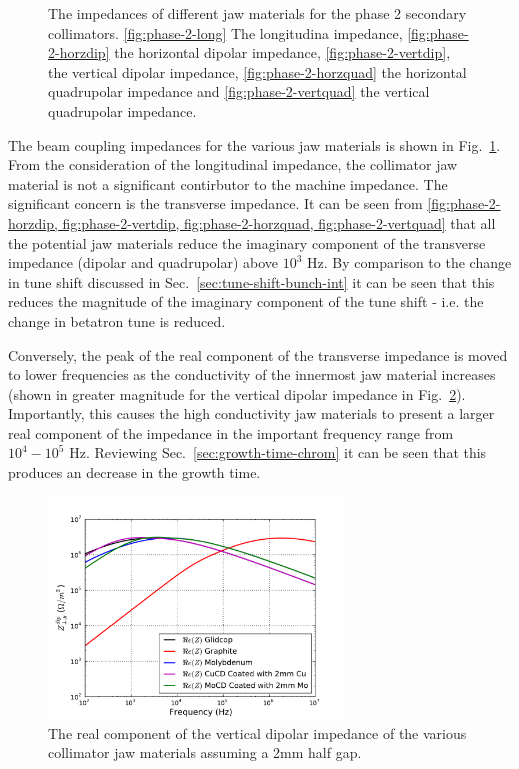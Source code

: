 \begin{figure}
{\label{fig:phase-2-vertquad}
}
\label{fig:phase-2-jaw-impedances}
\caption{The impedances of different jaw materials for the phase 2 secondary collimators. \ref{fig:phase-2-long} The longitudina impedance, \ref{fig:phase-2-horzdip} the horizontal dipolar impedance, \ref{fig:phase-2-vertdip}, the vertical dipolar impedance, \ref{fig:phase-2-horzquad} the horizontal quadrupolar impedance and \ref{fig:phase-2-vertquad} the vertical quadrupolar impedance.}
\end{figure}

The beam coupling impedances for the various jaw materials is shown in Fig.~\ref{fig:phase-2-jaw-impedances}. From the consideration of the longitudinal impedance, the collimator jaw material is not a significant contirbutor to the machine impedance. The significant concern is the transverse impedance. It can be seen from \ref{fig:phase-2-horzdip, fig:phase-2-vertdip, fig:phase-2-horzquad, fig:phase-2-vertquad} that all the potential jaw materials reduce the imaginary component of the transverse impedance (dipolar and quadrupolar) above $10^{3}$ Hz. By comparison to the change in tune shift discussed in Sec.~\ref{sec:tune-shift-bunch-int} it can be seen that this reduces the magnitude of the imaginary component of the tune shift - i.e. the change in betatron tune is reduced. 

Conversely, the peak of the real component of the transverse impedance is moved to lower frequencies as the conductivity of the innermost jaw material increases (shown in greater magnitude for the vertical dipolar impedance in Fig.~\ref{fig:phase-2-vertdip-zoom}). Importantly, this causes the high conductivity jaw materials to present a larger real component of the impedance in the important frequency range from $10^{4}-10^{5}$ Hz. Reviewing Sec.~\ref{sec:growth-time-chrom} it can be seen that this produces an decrease in the growth time. 

\begin{figure}
\begin{center}
\includegraphics[width=0.7\textwidth]{LHC_Collimation_Upgrades/figures/vertDipolarZoom.pdf}
\end{center}
\label{fig:phase-2-vertdip-zoom}
\caption{The real component of the vertical dipolar impedance of the various collimator jaw materials assuming a 2mm half gap.}
\end{figure}
